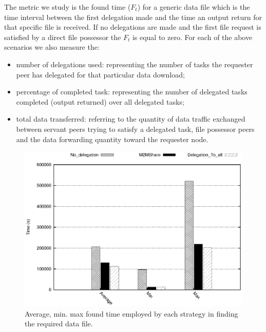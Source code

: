 The metric we study is the found time ($F_{t}$) for a generic data file which is the time interval between the first delegation made and the time an output return for that specific file is
received. If no delegations are made and the first file request is satisfied by a direct file possessor the $F_{t}$ is equal to zero. For each of the above scenarios we also measure the:
\begin{itemize}
\item number of delegations used: representing the number of tasks the requester peer has delegated for that particular data download;
\item percentage of completed task: representing the number of delegated tasks completed (output returned) over all delegated tasks;
\item total data transferred: referring to the quantity of data traffic exchanged between servant peers trying to satisfy a delegated task, file possessor peers and the data forwarding quantity toward the requester node.
\end{itemize}

\begin{figure}[!htbp]
\centering
\includegraphics{grafici/tempi.eps}
\caption{Average, min. max found time employed by each strategy in finding the required data file.}
\label{graficoTempiVF}
\end{figure}

